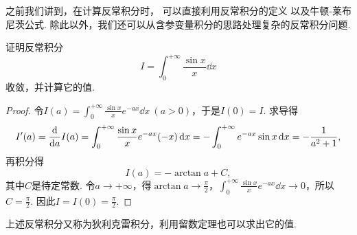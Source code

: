 之前我们讲到，在计算反常积分时，%
可以直接利用反常积分的定义%
以及牛顿-莱布尼茨公式.
除此以外，我们还可以从含参变量积分的思路处理复杂的反常积分问题.

\begin{example}
证明反常积分\[
I = \int_0^{+\infty} \frac{\sin x}{x} \dd{x}
\]收敛，并计算它的值.
\begin{proof}
令\(I(a) = \int_0^{+\infty} \frac{\sin x}{x} e^{-ax} \dd{x}\ (a>0)\)，于是\(I(0) = I\).
求导得\[
I'(a) = \dv{a} I(a) = \int_0^{+\infty} \frac{\sin x}{x} e^{-ax} (-x) \dd{x}
= - \int_0^{+\infty} e^{-ax} \sin x \dd{x}
= - \frac{1}{a^2+1},
\]再积分得\[
I(a) = -\arctan a + C,
\]其中\(C\)是待定常数.
令\(a\to+\infty\)，得\(\arctan a\to\frac{\pi}{2}\)，\(\int_0^{+\infty} \frac{\sin x}{x} e^{-ax} \dd{x} \to 0\)，所以\(C = \frac{\pi}{2}\).
因此\(I = I(0) = \frac{\pi}{2}\).
\end{proof}
\end{example}
上述反常积分又称为狄利克雷积分，利用留数定理也可以求出它的值.
